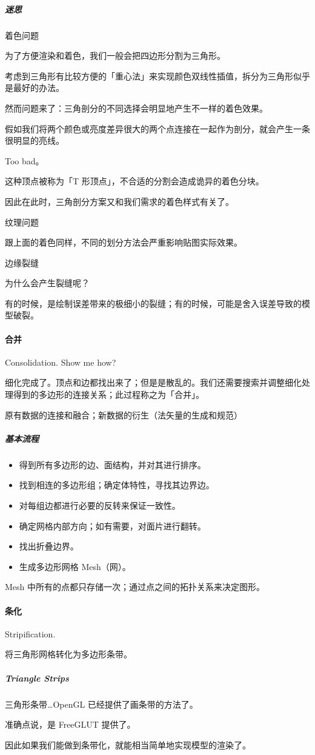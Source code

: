 \documentclass[
]{article}
\begin{document}
\hypertarget{header-n130}{%
\subparagraph{迷思}\label{header-n130}}

着色问题

为了方便渲染和着色，我们一般会把四边形分割为三角形。

考虑到三角形有比较方便的「重心法」来实现颜色双线性插值，拆分为三角形似乎是最好的办法。

然而问题来了：三角剖分的不同选择会明显地产生不一样的着色效果。

假如我们将两个颜色或亮度差异很大的两个点连接在一起作为剖分，就会产生一条很明显的亮线。

Too bad。

这种顶点被称为「T 形顶点」，不合适的分割会造成诡异的着色分块。

因此在此时，三角剖分方案又和我们需求的着色样式有关了。

纹理问题

跟上面的着色同样，不同的划分方法会严重影响贴图实际效果。

边缘裂缝

为什么会产生裂缝呢？

有的时候，是绘制误差带来的极细小的裂缝；有的时候，可能是舍入误差导致的模型破裂。

\hypertarget{header-n144}{%
\paragraph{合并}\label{header-n144}}

Consolidation. Show me how?

细化完成了。顶点和边都找出来了；但是是散乱的。我们还需要搜索并调整细化处理得到的多边形的连接关系；此过程称之为「合并」。

原有数据的连接和融合；新数据的衍生（法矢量的生成和规范）

\hypertarget{header-n148}{%
\subparagraph{基本流程}\label{header-n148}}

\begin{itemize}
\item
  得到所有多边形的边、面结构，并对其进行排序。
\item
  找到相连的多边形组；确定体特性，寻找其边界边。
\item
  对每组边都进行必要的反转来保证一致性。
\item
  确定网格内部方向；如有需要，对面片进行翻转。
\item
  找出折叠边界。
\item
  生成多边形网格 Mesh（网）。
\end{itemize}

Mesh 中所有的点都只存储一次；通过点之间的拓扑关系来决定图形。

\hypertarget{header-n163}{%
\paragraph{条化}\label{header-n163}}

Stripification.

将三角形网格转化为多边形条带。

\hypertarget{header-n166}{%
\subparagraph{Triangle Strips}\label{header-n166}}

三角形条带\ldots OpenGL 已经提供了画条带的方法了。

准确点说，是 FreeGLUT 提供了。

因此如果我们能做到条带化，就能相当简单地实现模型的渲染了。
\end{document}
